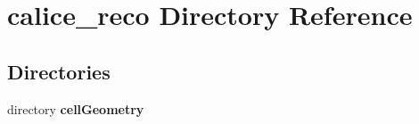 \section{calice\-\_\-reco Directory Reference}
\label{dir_aa5152576b83acadfecf1e9f3e210c0e}
\subsection*{Directories}
\begin{DoxyCompactItemize}
\item 
directory {\bf cell\-Geometry}
\end{DoxyCompactItemize}
